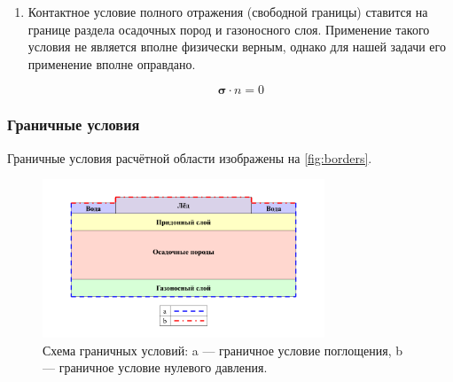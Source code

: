 \begin{enumerate}
    \item Контактное условие полного отражения (свободной границы) ставится на границе раздела осадочных пород и газоносного слоя. Применение такого условия не является вполне физически верным, однако для нашей задачи его применение вполне оправдано.

    \begin{equation}
        \pmb{\sigma} \cdot n = 0
    \end{equation}

\end{enumerate}

\subsubsection{Граничные условия}

Граничные условия расчётной области изображены на \autoref{fig:borders}.

\begin{figure}[htb]
    \centering
    \includegraphics[trim={90pt 35pt 90pt 60pt},clip,width=0.75\textwidth]
    {images/gas_field/border_conds.png}
    \caption{Схема граничных условий: a --- граничное условие поглощения, b --- граничное условие нулевого давления.}
    \label{fig:borders}
\end{figure}

